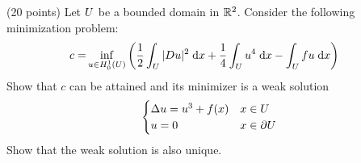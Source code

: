 (20 points)
Let $U$ be a bounded domain in $\mathbb{R}^2$.
Consider the following minimization problem:
\begin{align*}
  c = &\inf_{u \in H_0^{1}\left(U \right)} \left( \frac{1}{2} \int_U |D u|^2 \;\mathrm{d}x
                                        + \frac{1}{4} \int_U u^4 \;\mathrm{d}x
                                        - \int_U f u \;\mathrm{d}x
                                 \right)
\end{align*}
Show that $c$ can be attained and its minimizer is a weak solution
\begin{align*}
  \begin{cases}
    \Delta u = u^3  + f(x) & x \in U\\
    u = 0 & x \in \partial U
  \end{cases}
\end{align*}
Show that the weak solution is also unique.
